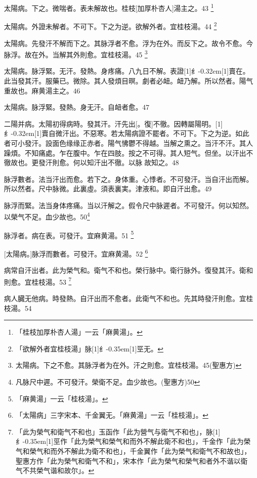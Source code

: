 \documentclass[11pt,oneside,b5paper]{ctexbook}
\begin{document}
\begin{flushleft}
太陽病。下之。微喘者。表未解故也。桂枝[加厚朴杏人]湯主之。43
\footnote{「桂枝加厚朴杏人湯」一云「麻黄湯」。}

太陽病。外證未解者。不可下。下之为逆。欲解外者。宜桂枝湯。44
\footnote{「欲解外者宜桂枝湯」脉{\hbox{\scalebox{0.68}[1]{纟}\kern-0.35em\scalebox{0.64}[1]{巠}}}无。}

太陽病。先發汗不解而下之。其脉浮者不愈。浮为在外。而反下之。故令不愈。今脉浮。故在外。当解其外則愈。宜桂枝湯。45
\footnote{太陽病。下之不愈。其脉浮者为在外。汗之則愈。宜桂枝湯。45(聖惠方)}

太陽病。脉浮緊。无汗。發熱。身疼痛。八九日不解。表證{\hbox{\scalebox{0.6}[1]{纟}\kern-0.32em\scalebox{0.7}[1]{賣}}}在。此当發其汗。服藥已。微除。其人發煩目暝。劇者必衄。衄乃解。所以然者。陽气重故也。麻黄湯主之。46

太陽病。脉浮緊。發熱。身无汗。自衄者愈。47

二陽并病。太陽初得病時。發其汗。汗先出[。復]不徹。因轉屬陽明。{\hbox{\scalebox{0.6}[1]{纟}\kern-0.32em\scalebox{0.7}[1]{賣}}}自微汗出。不惡寒。若太陽病證不罷者。不可下。下之为逆。如此者可小發汗。設面色缘缘正赤者。陽气怫鬱不得越。当解之熏之。当汗不汗。其人躁煩。不知痛處。乍在腹中。乍在四肢。按之不可得。其人短气。但坐。以汗出不徹故也。更發汗則愈。何以知汗出不徹。以脉{𬈧}故知之。48

脉浮數者。法当汗出而愈。若下之。身体重。心悸者。不可發汗。当自汗出而解。所以然者。尺中脉微。此裏虛。須表裏実。津液和。即自汗出愈。49

脉浮而緊。法当身体疼痛。当以汗解之。假令尺中脉遲者。不可發汗。何以知然。以榮气不足。血少故也。50\footnote{凡脉尺中遲。不可發汗。榮衛不足。血少故也。(聖惠方)50}

脉浮者。病在表。可發汗。宜麻黄湯。51
\footnote{「麻黄湯」一云「桂枝湯」。}

[太陽病。]脉浮而數者。可發汗。宜麻黄湯。52
\footnote{「太陽病」三字宋本、千金翼无。「麻黄湯」一云「桂枝湯」。}

病常自汗出者。此为榮气和。衛气不和也。榮行脉中。衛行脉外。復發其汗。衛和則愈。宜桂枝湯。53
\footnote{「此为榮气和衛气不和也」玉函作「此为營气与衛气不和也」，脉{\hbox{\scalebox{0.68}[1]{纟}\kern-0.35em\scalebox{0.64}[1]{巠}}}作「此为榮气和榮气和而外不解此衛不和也」，千金作「此为榮气和榮气和而外不解此为衛不和也」，千金翼作「此为榮气和衛气不和故也」，聖惠方作「此为榮气和衛气不和」，宋本作「此为榮气和榮气和者外不谐以衛气不共榮气谐和故尔」。}

病人臓无他病。時發熱。自汗出而不愈者。此衛气不和也。先其時發汗則愈。宜桂枝湯。54


\end{flushleft}
\end{document}
